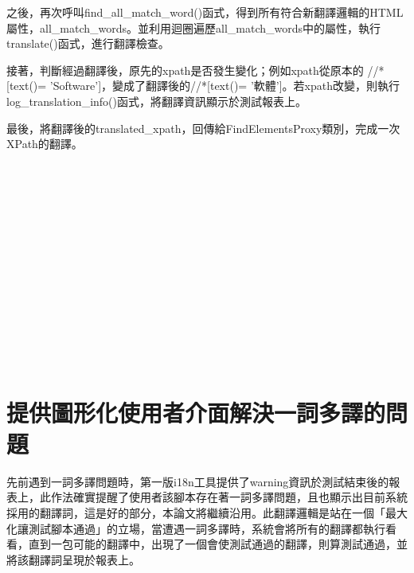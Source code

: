 之後，再次呼叫find\_all\_match\_word()函式，得到所有符合新翻譯邏輯的HTML屬性，all\_match\_words。並利用迴圈遍歷all\_match\_words中的屬性，執行translate()函式，進行翻譯檢查。
	
接著，判斷經過翻譯後，原先的xpath是否發生變化；例如xpath從原本的 //*[text()= 'Software']，變成了翻譯後的//*[text()= '軟體']。若xpath改變，則執行log\_translation\_info()函式，將翻譯資訊顯示於測試報表上。

最後，將翻譯後的translated\_xpath，回傳給FindElementsProxy類別，完成一次XPath的翻譯。

\hspace*{\fill} \\
\\ \hspace*{\fill} \\
\\ \hspace*{\fill} \\
\\ \hspace*{\fill} \\
\\ \hspace*{\fill} \\
\\ \hspace*{\fill} \\
\\ \hspace*{\fill} \\
\section{提供圖形化使用者介面解決一詞多譯的問題}
先前遇到一詞多譯問題時，第一版i18n工具提供了warning資訊於測試結束後的報表上，此作法確實提醒了使用者該腳本存在著一詞多譯問題，且也顯示出目前系統採用的翻譯詞，這是好的部分，本論文將繼續沿用。此翻譯邏輯是站在一個「最大化讓測試腳本通過」的立場，當遭遇一詞多譯時，系統會將所有的翻譯都執行看看，直到一包可能的翻譯中，出現了一個會使測試通過的翻譯，則算測試通過，並將該翻譯詞呈現於報表上。

